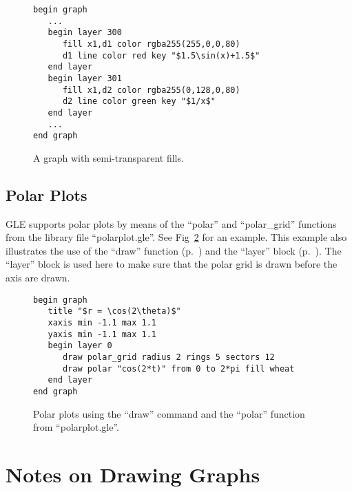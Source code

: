 \begin{figure}[tb]
\begin{minipage}[c]{7.5cm}
\begin{Verbatim}
begin graph
   ...
   begin layer 300
      fill x1,d1 color rgba255(255,0,0,80)
      d1 line color red key "$1.5\sin(x)+1.5$"
   end layer
   begin layer 301
      fill x1,d2 color rgba255(0,128,0,80)
      d2 line color green key "$1/x$"
   end layer
   ...
end graph
\end{Verbatim}
\end{minipage}
\hfill
\begin{minipage}[c]{7cm}
\hascairo{
\mbox{}
}
\end{minipage}
\caption{\label{fig:semitrans}A graph with semi-transparent fills.}
\end{figure}

\subsection{Polar Plots}
\label{sec:polar}

GLE supports polar plots by means of the ``polar'' and ``polar\_grid'' functions from the library file ``polarplot.gle''. See Fig~\ref{fig:polar} for an example. This example also illustrates the use of the ``draw'' function (p.~\pageref{cmd:gdraw}) and the ``layer'' block (p.~\pageref{cmd:layer}). The ``layer'' block is used here to make sure that the polar grid is drawn before the axis are drawn.

\begin{figure}[tb]
\begin{minipage}[c]{10.5cm}
\begin{Verbatim}
begin graph
   title "$r = \cos(2\theta)$"
   xaxis min -1.1 max 1.1
   yaxis min -1.1 max 1.1
   begin layer 0
      draw polar_grid radius 2 rings 5 sectors 12
      draw polar "cos(2*t)" from 0 to 2*pi fill wheat
   end layer
end graph
\end{Verbatim}
\end{minipage}
\hfill
\begin{minipage}[c]{5cm}
\mbox{}
\end{minipage}
\caption{\label{fig:polar}Polar plots using the ``draw'' command and the ``polar'' function from ``polarplot.gle''.}
\end{figure}

\section{Notes on Drawing Graphs}

